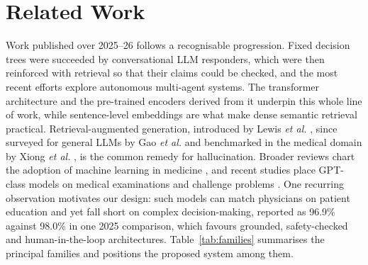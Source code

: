 \documentclass[conference]{IEEEtran}
\begin{document}
\section{Related Work}

Work published over 2025--26 follows a recognisable progression. Fixed
decision trees were succeeded by conversational LLM responders, which were
then reinforced with retrieval so that their claims could be checked, and the
most recent efforts explore autonomous multi-agent systems. The transformer
architecture \cite{vaswani} and the pre-trained encoders derived from it
\cite{bert} underpin this whole line of work, while sentence-level embeddings
\cite{sbert} are what make dense semantic retrieval practical.
Retrieval-augmented generation, introduced by Lewis \textit{et al.}
\cite{lewis}, since surveyed for general LLMs by Gao \textit{et al.}
\cite{gao} and benchmarked in the medical domain by Xiong \textit{et al.}
\cite{xiong}, is the common remedy for hallucination. Broader reviews chart
the adoption of machine learning in medicine \cite{topol,rajkomar}, and
recent studies place GPT-class models on medical examinations and challenge
problems \cite{thiru,nori}. One recurring observation motivates our design:
such models can match physicians on patient education and yet fall short on
complex decision-making, reported as 96.9\% against 98.0\% in one 2025
comparison, which favours grounded, safety-checked and human-in-the-loop
architectures. Table~\ref{tab:families} summarises the principal families and
positions the proposed system among them.
\end{document}
